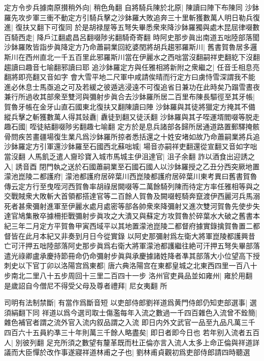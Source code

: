 定方令步兵據南原攅稍外向|{
	稍色角翻}
自將騎兵陳於北原|{
	陳讀曰陣下布陳同}
沙鉢羅先攻步軍三衝不動定方引騎兵擊之沙鉢羅大敗追奔三十里斬獲數萬人明日勒兵復進|{
	復扶又翻下可復同}
於是胡禄屋等五弩失畢悉衆來降沙鉢羅獨與處木昆屈律啜數百騎西走|{
	降戶江翻處昌呂翻啜陟劣翻騎奇寄翻}
時阿史那步眞出南道五咄陸部落聞沙鉢羅敗皆詣步眞降定方乃命蕭嗣業回紇婆閏將胡兵趨邪羅斯川|{
	舊書賀魯居多邏斯川在西州直北一千五百里此邪羅斯川當在伊麗水之西咄當沒翻嗣祥吏翻紇下沒翻趨讀曰趣音七喻翻邪讀曰耶}
追沙鉢羅定方與任雅相將新附之衆繼之|{
	任音壬相息亮翻將即亮翻又音如字}
會大雪平地二尺軍中咸請俟晴而行定方曰虜恃雪深謂我不能進必休息士馬亟追之可及若緩之彼遁逃浸遠不可復追省日兼功在此時矣乃蹋雪晝夜兼行所過收其部衆至雙河與彌射步眞合去沙鉢羅所居二百里布陳長驅徑至其牙帳|{
	賀魯牙帳在金牙山直石國東北復扶又翻陳讀曰陣}
沙鉢羅與其徒將獵定方掩其不備縱兵擊之斬獲數萬人得其䜴纛|{
	纛徒到翻又徒沃翻}
沙鉢羅與其子咥運壻閻啜等脱走趣石國|{
	咥徒結翻啜陟劣翻趣七喻翻}
定方於是息兵諸部各歸所居通道路置郵驛掩骸骨問疾苦畫疆場復生業凡爲沙鉢羅所掠者悉括還之十姓安堵如故乃命蕭嗣業將兵追沙鉢羅定方引軍還沙鉢羅至石國西北蘇咄城|{
	場音亦嗣祥吏翻還從宣翻又音如字咄當沒翻}
人馬飢乏遣人齎珍寶入城市馬城主伊沮達官|{
	沮子余翻}
詐以酒食出迎誘之入|{
	誘音酉}
閉門執之送於石國蕭嗣業至石國石國人以沙鉢羅授之乙丑分西突厥地置濛池崑陵二都護府|{
	濛池都護府居碎葉川西崑陵都護府居碎葉川東考異曰舊書賀魯傳云定方行至曳咥河西賀魯率胡祿居闕啜等二萬餘騎列陳而待定方率任雅相等與之交戰賊衆大敗斬大首領都搭達官等二百餘人賀魯及闕啜輕騎奔竄渡伊西麗河兵馬溺死者甚衆彌射進軍至伊麗水處月處密等部各帥衆來降彌射又進次雙河賀魯先使步失達官鳩集散卒據柵拒戰彌射步眞攻之大潰又與蘇定方攻賀魯於碎葉水大破之舊書本紀三年二月定方平賀魯甲寅西域平以其地置濛池崑陵二都督府據實錄擒賀魯置二都督皆在此月本紀又非奏到月日今從實錄}
以阿史那彌射爲左衛大將軍崑陵都護興昔亡可汗押五咄陸部落阿史那步眞爲右衛大將軍濛池都護繼往絶可汗押五弩失畢部落遣光祿卿盧承慶持節冊命仍命彌射步眞與承慶據諸姓降者凖其部落大小位望高下授刺史以下官丁卯以洛陽宫爲東都|{
	唐六典洛陽宫在東都皇城之北東西四里一百八十步南北二里八十五步周回十三里二百四十一步}
洛州官吏員品並如雍州|{
	雍於用翻}
是歲詔自今僧尼不得受父母及尊者禮拜|{
	尼女夷翻}
所

司明有法制禁斷|{
	有當作爲斷音短}
以吏部侍郎劉祥道爲黄門侍郎仍知吏部選事|{
	選須絹翻下同}
祥道以爲今選司取士傷濫每年入流之數過一千四百雜色入流曾不銓簡|{
	雜色補官者謂之流外官入流内叙品謂之入流}
即日内外文武官一品至九品凡萬三千四百六十五員約凖三十年則萬三千餘人略盡矣|{
	即日者即今日也}
若年别入流者五百人|{
	別彼列翻}
足充所須之數望有釐革既而杜正倫亦言入流人太多上命正倫與祥道詳議而大臣憚於改作事遂寢祥道林甫之子也|{
	劉林甫貞觀初爲吏部侍郎請四時聽選}


